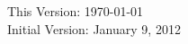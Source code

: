 \documentclass[11pt]{article}
\title{\mytitle}
\author{
  Stephen J. Barr \\
  ISOM \\
  Foster School of Business \\
  University of Washington \\
  email: \texttt{stevejb@uw.edu}
}
\begin{document}
\maketitle
\begin{center}
  This Version: \today \\ 
  Initial Version: January 9, 2012
\end{center}





% 
% 
% 
% 
% 

% 
% 


\end{document}
